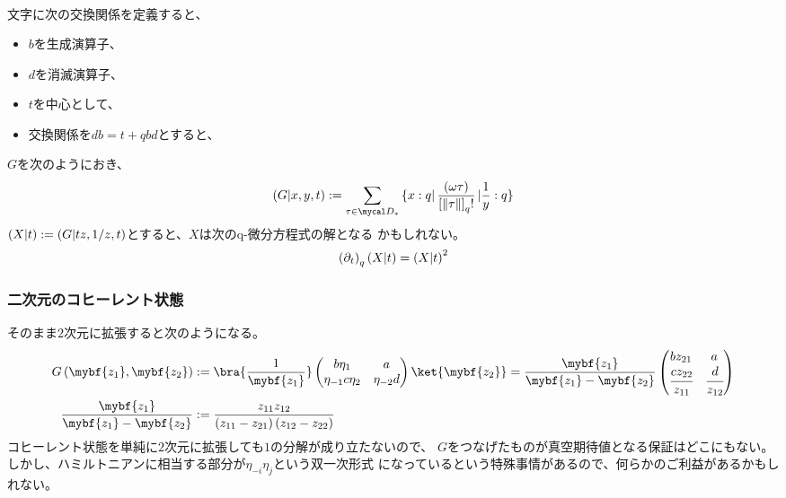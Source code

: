 {\begin{equation*}
\begin{split}
	\end{split}\end{equation*}
	文字に次の交換関係を定義すると、
	\begin{itemize}\setlength{\itemsep}{-1mm} %
		\item $b$を生成演算子、
		\item $d$を消滅演算子、
		\item $t$を中心として、
		\item 交換関係を$db = t + qbd$とすると、
	\end{itemize} %
	$G$を次のようにおき、
	\begin{equation*}\begin{split}
		\lr{G|x,y,t} 
		:= \sum_{\tau\in\D_*}\cbra{x:q} \frac{\lr{\omega\tau}}
			{\left[\dabs{\tau}\right]_q!} \cket{\frac{1}{y}:q}
	\end{split}\end{equation*}
	$\left({X|t}\right):=\left({G|tz,1/z,t}\right)$とすると、$X$は次のq-微分方程式の解となる
	かもしれない。
	\begin{equation*}\begin{split}
		\left({\partial_t}\right)_q\left({X|t}\right) = \left({X|t}\right)^2
	\end{split}\end{equation*}
\subsubsection{二次元のコヒーレント状態}\label{s3:二次元のコヒーレント状態} %
	そのまま$2$次元に拡張すると次のようになる。
	\begin{equation*}\begin{split}
		G\lr{\mybf{z_1},\mybf{z_2}} 
		&:= \bra{\frac{1}{\mybf{z_1}}} \begin{pmatrix}
			b\eta_1 & a \\ \eta_{-1}c\eta_2 & \eta_{-2}d
		\end{pmatrix} \ket{\mybf{z_2}}
		= \frac{\mybf{z_1}}{\mybf{z_1} - \mybf{z_2}} \begin{pmatrix}
			bz_{21} & a \\ \cfrac{cz_{22}}{z_{11}} & \cfrac{d}{z_{12}}
		\end{pmatrix} \\
		\frac{\mybf{z_1}}{\mybf{z_1} - \mybf{z_2}}
		&:= \frac{z_{11}z_{12}}{\lr{z_{11} - z_{21}}\lr{z_{12} - z_{22}}}
	\end{split}\end{equation*} 
	コヒーレント状態を単純に$2$次元に拡張しても$1$の分解が成り立たないので、
	$G$をつなげたものが真空期待値となる保証はどこにもない。
	しかし、ハミルトニアンに相当する部分が$\eta_{-i}\eta_j$という双一次形式
	になっているという特殊事情があるので、何らかのご利益があるかもしれない。
}
